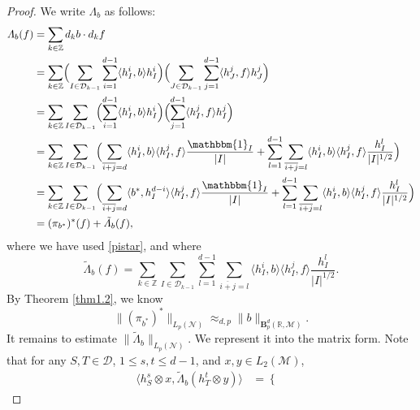 \documentclass[oneside,english,a4wide]{amsart}
\numberwithin{equation}{section}
\numberwithin{figure}{section}
\theoremstyle{plain}
\theoremstyle{plain}
\theoremstyle{definition}
\theoremstyle{plain}
\theoremstyle{remark}
\theoremstyle{definition}
\theoremstyle{remark}
\theoremstyle{definition}
\newcommand{\8}{\infty}
\begin{document}
\begin{proof}
	We write $	\varLambda_b$ as follows:
	\begin{equation}\label{Lambdasum}
		\begin{aligned}
			\varLambda_b(f){}&=\sum_{k\in\mathbb{Z}}d_kb\cdot d_kf\\
			&=\sum_{k\in\mathbb{Z}}\Bigl(\sum_{I\in\mathcal{D}_{k-1}}\sum_{i=1}^{d-1}\langle h_I^i,b\rangle h_I^i\Bigr)\Bigl(\sum_{J\in\mathcal{D}_{k-1}}\sum_{j=1}^{d-1}\langle h_J^j,f\rangle h_J^j\Bigr)\\
			&=\sum_{k\in\mathbb{Z}}\sum_{I\in\mathcal{D}_{k-1}}\Bigl(\sum_{i=1}^{d-1}\langle h_I^i,b\rangle h_I^i\Bigr)\Bigl(\sum_{j=1}^{d-1}\langle h_I^j,f\rangle h_I^j\Bigr)\\
			&=\sum_{k\in\mathbb{Z}}\sum_{I\in\mathcal{D}_{k-1}}\Bigl(\sum_{\overline{i+j}=d}\langle h_I^i,b\rangle\langle h_I^j,f\rangle \frac{\mathbbm{1}_I}{|I|}+\sum_{l=1}^{d-1}\sum_{\overline{i+j}=l}\langle h_I^i,b\rangle\langle h_I^j,f\rangle \frac{h_I^l}{|I|^{1/2}}\Bigr)\\
			&=\sum_{k\in\mathbb{Z}}\sum_{I\in\mathcal{D}_{k-1}}\Bigl(\sum_{\overline{i+j}=d}\langle b^*,h_I^{d-i}\rangle\langle h_I^j,f\rangle \frac{\mathbbm{1}_I}{|I|}+\sum_{l=1}^{d-1}\sum_{\overline{i+j}=l}\langle h_I^i,b\rangle\langle h_I^j,f\rangle \frac{h_I^l}{|I|^{1/2}}\Bigr)\\
			&=(\pi_{b^*})^*(f)+\tilde{\varLambda}_b(f),
		\end{aligned}
	\end{equation}
	where we have used \eqref{pistar}, and where
	\begin{equation}\label{tildevar}
		\tilde{\varLambda}_b(f)=\sum_{k\in\mathbb{Z}}\sum_{I\in\mathcal{D}_{k-1}}\sum_{l=1}^{d-1}\sum_{\overline{i+j}=l}\langle h_I^i,b\rangle\langle h_I^j,f\rangle \frac{h_I^l}{|I|^{1/2}}.
	\end{equation}
	By Theorem \ref{thm1.2}, we know
	\begin{equation}\label{bbbp}
		\|(\pi_{b^*})^*\|_{L_p(\mathcal{N})}\approx_{d,p} \|b\|_{\pmb{B}_p^{d}(\mathbb{R},\mathcal{M})}.
	\end{equation}
	It remains to estimate $\|\tilde{\varLambda}_b\|_{L_p(\mathcal{N})}$. We represent it into the matrix form. Note that for any $S,T\in \mathcal{D}$,  $1\le s,t\le d-1$, and $x,y\in L_2(\mathcal{M})$,
	\begin{equation*}
		\begin{aligned}
			\langle h_S^s\otimes x,\tilde{\varLambda}_b(h_T^t\otimes y)\rangle{}&=
			\begin{cases}

\end{cases}
\end{aligned}
\end{equation*}
\end{proof}
\end{document}

